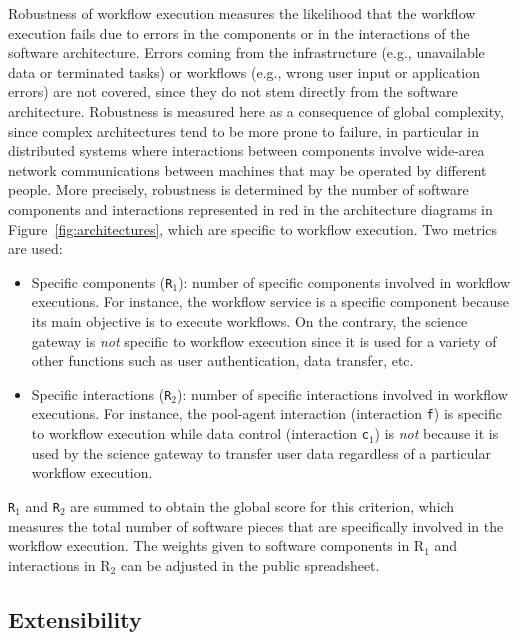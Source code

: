 \documentclass[preprint,3p,twocolumn]{elsarticle}
\newcommand{\correction}[1]{\color{blue}#1\color{black}\xspace}
\begin{document}
Robustness of workflow execution measures the likelihood that
the workflow execution fails due to errors in the components or in the
interactions of the software architecture. Errors coming from the
infrastructure (e.g., unavailable data or terminated tasks) or
workflows (e.g., wrong user input or application errors) are not
covered, since they do not stem directly from the software
architecture.  Robustness is measured here as a consequence of global
complexity, since complex architectures tend to be more prone to
failure, \correction{in particular in distributed systems where
  interactions between components involve wide-area network
  communications between machines that may be operated by different
  people}. More precisely, robustness is determined by the number of
software components and interactions represented in red in the
architecture diagrams in Figure~\ref{fig:architectures}, which are
specific to workflow execution. Two metrics are used:
\begin{itemize}[leftmargin=0cm,itemindent=0.35cm,itemsep=0cm]
\item Specific components (\texttt{R$_1$}): number of specific
  components involved in workflow executions. \correction{For instance, the
  workflow service is a specific component because its main objective
  is to execute workflows. On the contrary, the science gateway is
  \emph{not} specific to workflow execution since it is used for a
  variety of other functions such as user authentication, data
  transfer, etc.}
\item Specific interactions (\texttt{R$_2$}): number of specific
  interactions involved in workflow executions. \correction{For
    instance, the pool-agent interaction (interaction \texttt{f}) is
    specific to workflow execution while data control (interaction
    \texttt{c$_1$}) is \emph{not} because it is used by the science gateway to transfer
    user data regardless of a particular workflow execution}.
\end{itemize}
\texttt{R$_1$} and \texttt{R$_2$} are
summed to obtain the global score for this criterion, which measures
the total number of software pieces that are specifically involved in
the workflow execution. \correction{The weights given to software components in R$_1$ and interactions in R$_2$ can be adjusted in the public spreadsheet.}

\subsection{\correction{Extensibility}}
\end{document}
